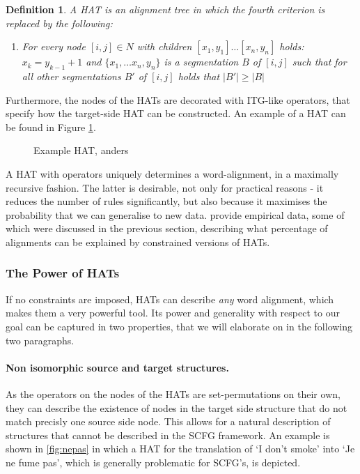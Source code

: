 \documentclass{report}
\theoremstyle{definition}
\theoremstyle{plain}
\newtheorem{definition}{Definition}
\begin{document}
\begin{definition}
A HAT is an alignment tree in which the fourth criterion is replaced by the following:
\begin{enumerate}
\item[4.] For every node $[i,j] \in N$ with children $[x_1,y_1]\ldots [x_n,y_n]$ holds: $x_k = y_{k-1}+1$ and $\{x_1,\ldots x_n, y_n\}$ is a segmentation $B$ of $[i,j]$ such that for all other segmentations $B'$ of $[i,j]$ holds that $|B'|\geq |B|$ %
\end{enumerate}
\end{definition}

Furthermore, the nodes of the HATs are decorated with ITG-like operators, that specify how the target-side HAT can be constructed. An example of a HAT can be found in Figure \ref{fig:hat}.

\begin{figure}
\caption{Example HAT, anders}\label{fig:hat}
\end{figure}

A HAT with operators uniquely determines a word-alignment, in a maximally recursive fashion. The latter is desirable, not only for practical reasons - it reduces the number of rules significantly, but also because it maximises the probability that we can generalise to new data. \cite{simaan2013hats} provide empirical data, some of which were discussed in the previous section, describing what percentage of alignments can be explained by constrained versions of HATs. 

\subsubsection{The Power of HATs}

If no constraints are imposed, HATs can describe \textit{any} word alignment, which makes them a very powerful tool. Its power and generality with respect to our goal can be captured in two properties, that we will elaborate on in the following two paragraphs.

\paragraph{Non isomorphic source and target structures.} As the operators on the nodes of the HATs are set-permutations on their own, they can describe the existence of nodes in the target side structure that do not match precisly one source side node. This allows for a natural description of structures that cannot be described in the SCFG framework. An example is shown in \ref{fig:nepas} in which a HAT for the translation of `I don't smoke' into `Je ne fume pas', which is generally problematic for SCFG's, is depicted.
\end{document}
